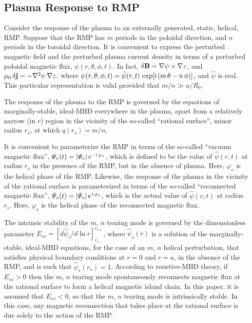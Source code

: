 \documentclass[12pt,prb,aps]{revtex4-1}
\begin{document}
\subsection{Plasma Response to RMP}
Consider the response of the plasma to an externally generated, static, helical, RMP. 
Suppose that the RMP has $m$ periods in the poloidal direction, and $n$ periods in the toroidal direction.
It is convenient to express the perturbed magnetic field and the perturbed plasma current density in
terms of a perturbed poloidal magnetic flux, $\psi(r,\theta,\phi,t)$. In fact, $\delta{\bf B} = \nabla\psi\times \nabla z$, 
and $\mu_0\,\delta {\bf j} = - \nabla^2\psi\,\nabla z$,
where $\psi(r,\theta,\phi,t) = \hat{\psi}(r,t)\,\exp[{\rm i}\,(m\,\theta-n\,\phi)]$, and $\hat{\psi}$ is real. This particular representation
is valid provided that $m/n\gg a/R_0$.\cite{rfa}

The response of the plasma to the RMP is governed by the equations of marginally-stable, ideal-MHD everywhere in the
plasma, apart from a relatively narrow (in $r$) region in the vicinity of the so-called  ``rational surface'', minor radius $r_s$, 
at which $q(r_s)=m/n$.\cite{rfa}

It is convenient to parameterize the RMP in terms of the so-called ``vacuum magnetic flux'', ${\mit\Psi}_v(t) = |{\mit\Psi}_v|\,{\rm e}^{-{\rm i}\,\varphi_v}$,
which is defined to be the value of $\hat{\psi}(r,t)$ at radius $r_s$ in the presence of the RMP, but in the absence of plasma. Here,
$\varphi_v$ is the helical phase of the RMP. Likewise, the response of the plasma in the vicinity of the rational
surface is parameterized in terms of the so-called ``reconnected magnetic flux'', ${\mit\Psi}_s(t)=|{\mit\Psi}_s|\,{\rm e}^{\,{\rm i}\,\varphi_s}$, 
which is the actual value of $\hat{\psi}(r,t)$ at radius $r_s$. Here, $\varphi_s$ is the helical phase of
the reconnected magnetic flux.

The intrinsic stability of the $m$, $n$ tearing mode is governed by the dimensionless parameter
$E_{ss}= [d\hat{\psi}_s/d\ln r]_{r_{s-}}^{r_{s+}}$, where $\hat{\psi}_s(r)$
is a solution of the marginally-stable, ideal-MHD equations, for the case of an $m$, $n$ helical
perturbation, that satisfies physical boundary conditions at $r=0$ and $r=a$, in the absence of the
RMP, and is such that $\hat{\psi}_s(r_s)=1$.\cite{fkr,am1} According to resistive-MHD theory,\cite{fkr,ruth}
if $E_{ss}>0$ then the $m$, $n$ tearing mode spontaneously reconnects magnetic flux at the rational
surface to form a helical magnetic island chain. In this paper, it is assumed that $E_{ss}<0$, so that the
$m$, $n$ tearing mode is intrinsically stable. In this case, any magnetic reconnection that takes place
at the rational surface is due solely to the action of the RMP.
\end{document}
